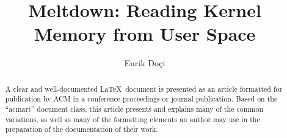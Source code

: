 \documentclass[sigconf]{acmart}
\begin{document}
\title{Meltdown: Reading Kernel Memory from User Space}

\author{Enrik Doçi}

\renewcommand{\shortauthors}{Enrik Doçi}

\begin{abstract}
  A clear and well-documented \LaTeX\ document is presented as an
  article formatted for publication by ACM in a conference proceedings
  or journal publication. Based on the ``acmart'' document class, this
  article presents and explains many of the common variations, as well
  as many of the formatting elements an author may use in the
  preparation of the documentation of their work.
\end{abstract}





\maketitle
\end{document}
